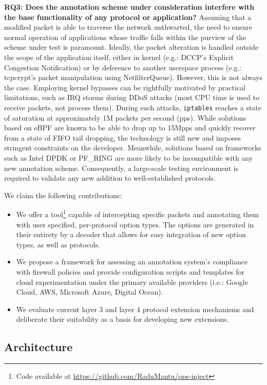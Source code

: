 \textbf{RQ3: Does the annotation scheme under consideration interfere with the base functionality of any protocol or application?}
Assuming that a modified packet is able to traverse the network unthwarted, the need to ensure normal operation of applications whose traffic falls within the purview of the scheme under test is paramount. Ideally, the packet alteration is handled outside the scope of the application itself, either in kernel (e.g.: DCCP's Explicit Congestion Notification) or by deference to another userspace process (e.g.: tcpcrypt's packet manipulation using NetfilterQueue). However, this is not always the case. Employing kernel bypasses can be rightfully motivated by practical limitations, such as IRQ storms during DDoS attacks (most CPU time is used to receive packets, not process them). During such attacks, \texttt{iptables} reaches a state of saturation at approximately 1M packets per second (pps). While solutions based on eBPF are known to be able to drop up to 15Mpps and quickly recover from a state of FIFO tail dropping, the technology is still new and imposes stringent constraints on the developer. Meanwhile, solutions based on frameworks such as Intel DPDK or PF\_RING are more likely to be incompatible with any new annotation scheme. Consequently, a large-scale testing environment is required to validate any new addition to well-established protocols.

We claim the following contributions:
\begin{itemize}
    \item We offer a tool\footnote{Code available at \url{https://github.com/RaduMantu/ops-inject}} capable of intercepting specific packets and annotating them with user specified, per-protocol option types. The options are generated in their entirety by a decoder that allows for easy integration of new option types, as well as protocols.
    \item We propose a framework for assessing an annotation system's compliance with firewall policies and provide configuration scripts and templates for cloud experimentation under the primary available providers (i.e.: Google Cloud, AWS, Microsoft Azure, Digital Ocean).
    \item We evaluate current layer 3 and layer 4 protocol extension mechanisms and deliberate their suitability as a basis for developing new extensions.
\end{itemize}

\subsection{Architecture}
\label{extend:ops:architecture}

